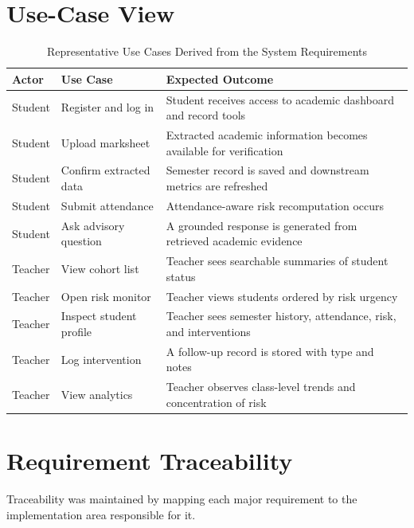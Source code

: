 \section{Use-Case View}
\begin{table}[H]
\centering
\caption{Representative Use Cases Derived from the System Requirements}
\begin{tabularx}{\textwidth}{>{\raggedright\arraybackslash}p{} >{\raggedright\arraybackslash}p{} >{\raggedright\arraybackslash}X}
\toprule
\textbf{Actor} & \textbf{Use Case} & \textbf{Expected Outcome} \\
\midrule
Student & Register and log in & Student receives access to academic dashboard and record tools \\
Student & Upload marksheet & Extracted academic information becomes available for verification \\
Student & Confirm extracted data & Semester record is saved and downstream metrics are refreshed \\
Student & Submit attendance & Attendance-aware risk recomputation occurs \\
Student & Ask advisory question & A grounded response is generated from retrieved academic evidence \\
Teacher & View cohort list & Teacher sees searchable summaries of student status \\
Teacher & Open risk monitor & Teacher views students ordered by risk urgency \\
Teacher & Inspect student profile & Teacher sees semester history, attendance, risk, and interventions \\
Teacher & Log intervention & A follow-up record is stored with type and notes \\
Teacher & View analytics & Teacher observes class-level trends and concentration of risk \\
\bottomrule
\end{tabularx}
\end{table}

\section{Requirement Traceability}
Traceability was maintained by mapping each major requirement to the implementation area responsible for it.

